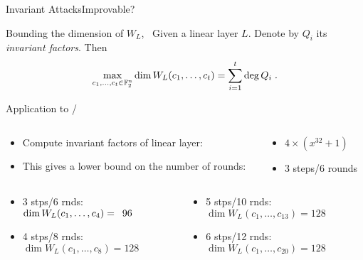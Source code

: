\begin{frame}{Invariant Attacks}{Improvable?}
    \begin{block}{Bounding the dimension of $W_L$,~\cite[Theorem~1]{C:BCLR17}}
        Given a linear layer $L$.
        Denote by $Q_i$ its \emph{invariant factors}.
        Then
        \begin{equation*}
            \max_{c_1, \dots, c_t \in \mathbb{F}_2^n} \dim W_L(c_1, \dots, c_t) = \sum_{i=1}^t \deg Q_i\;.
        \end{equation*}
    \end{block}
    \pause
    \begin{block}{Application to \clyde/}
    \begin{columns}
        \begin{column}{0.6\textwidth}
        \begin{itemize}
            \item Compute invariant factors of linear layer:
            \item This gives a lower bound on the number of rounds:
        \end{itemize}
        \end{column}
        \pause
        \begin{column}{0.35\textwidth}
        \begin{itemize}
            \item[] $4 \times (x^{32}+1)$
            \item[] 3 steps/6 rounds
        \end{itemize}
        \end{column}
    \end{columns}
    \pause
    \begin{columns}
        \begin{column}{0.475\textwidth}
            \begin{itemize}
                \item 3 stps/6 rnds: $\dim W_L(c_1,\dots,c_4) = \hphantom{1}96$
                \item 4 stps/8 rnds: $\dim W_L(c_1,\dots,c_8) = 128$
            \end{itemize}
        \end{column}
        \begin{column}{0.475\textwidth}
            \begin{itemize}
                \item 5 stps/10 rnds: $\dim W_L(c_1,\dots,c_{13}) = 128$
                \item 6 stps/12 rnds: $\dim W_L(c_1,\dots,c_{20}) = 128$
            \end{itemize}
        \end{column}
    \end{columns}
    \end{block}
\end{frame}
